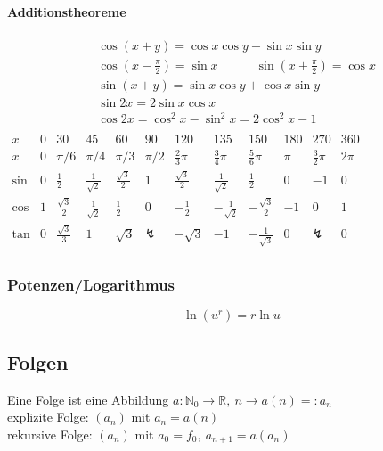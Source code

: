 \documentclass[6pt,a4paper]{scrartcl}
\newcommand{\enbrace}[1]{\ensuremath{\left(#1\right)}}
\begin{document}
\begin{multicols*}{4}
\paragraph{Additionstheoreme} %
\label{par:additionstheoreme}
 \begin{eqnarray*}
 	& \cos (x + y) = \cos x \cos y - \sin x \sin y \\
	& \cos \enbrace{x - \frac{\pi}{2}} = \sin x \qquad \quad \sin \enbrace{x + \frac{\pi}{2}} = \cos x \\
    & \sin \enbrace{x + y} = \sin x \cos y + \cos x \sin y \\
& 	\sin 2x = 2 \sin x \cos x        \\
	& \cos 2x = \cos^2 x - \sin^2 x = 2\cos^2 x - 1\\
 \end{eqnarray*}
\hspace{-20pt}
\scalebox{0.77}
{
$\begin{array}{c|c|c|c|c|c|c|c|c|c|c|c}
x & 0& 30 & 45& 60 & 90 & 120 & 135& 150& 180 & 270 & 360 \\ \hline
x & 0 & \pi / 6 & \pi / 4 & \pi / 3 & \pi / 2 & \frac{2}{3}\pi& \frac{3}{4}\pi& \frac{5}{6}\pi& \pi  & \frac{3}{2}\pi & 2 \pi \\ \hline
\sin & 0 & \frac{1}{2} & \frac{1}{\sqrt{2}} & \frac{\sqrt 3}{2} & 1 & \frac{\sqrt 3}{2} & \frac{1}{\sqrt{2}} & \frac{1}{2} & 0 & -1 & 0 \\
\cos & 1 & \frac{\sqrt 3}{2} & \frac{1}{\sqrt 2} & \frac{1}{2} & 0 & -\frac{1}{2} & -\frac{1}{\sqrt 2}  & -\frac{\sqrt 3}{2}   & -1 & 0 & 1 \\
\tan & 0 & \frac{\sqrt{3}}{3}&1 &\sqrt{3} & \lightning & -\sqrt{3}& -1& -\frac{1}{\sqrt{3}} & 0 & \lightning & 0\\
\end{array}$
}

\subsubsection{Potenzen/Logarithmus}
\begin{equation*}
\ln(u^r)=r\ln u
\end{equation*}

\subsection{Folgen}
Eine Folge ist eine Abbildung $a: \mathbb N_0 \rightarrow \mathbb R,\ n \rightarrow a(n) =: a_n$\\
explizite Folge: $(a_n)$ mit $a_n=a(n)$\\ rekursive Folge: $(a_n)$ mit $a_0=f_0,\  a_{n+1}=a(a_n)$\\


\end{multicols*}
\end{document}
